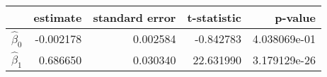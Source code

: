\begin{tabular}{lrrrr}
\toprule
{} &  estimate &  standard error &  t-statistic &       p-value \\
\midrule
$\hat{\beta}_0$ & -0.002178 &   0.002584 &    -0.842783 &  4.038069e-01 \\
$\hat{\beta}_1$ &  0.686650 &   0.030340 &    22.631990 &  3.179129e-26 \\
\bottomrule
\end{tabular}

